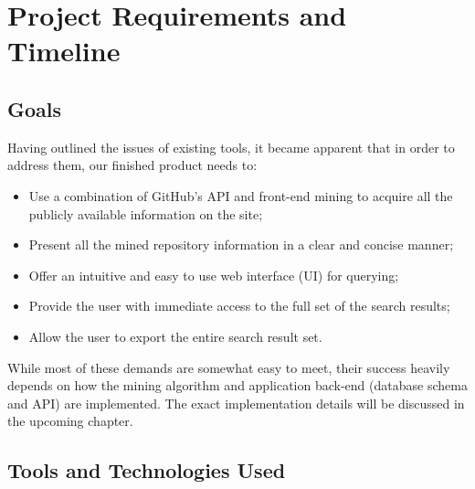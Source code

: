 \chapter{Project Requirements and Timeline}

\section{Goals}

Having outlined the issues of existing tools, it became apparent that in order to address them, our finished product needs to:

\begin{itemize}
    \item Use a combination of GitHub's API and front-end mining to acquire all the publicly available information on the site;
    \item Present all the mined repository information in a clear and concise manner;
    \item Offer an intuitive and easy to use web interface (UI) for querying;
    \item Provide the user with immediate access to the full set of the search results;
    \item Allow the user to export the entire search result set.
\end{itemize}

While most of these demands are somewhat easy to meet, their success heavily depends on how the mining algorithm and application back-end (database schema and API) are implemented.
The exact implementation details will be discussed in the upcoming chapter.

\section{Tools and Technologies Used}

